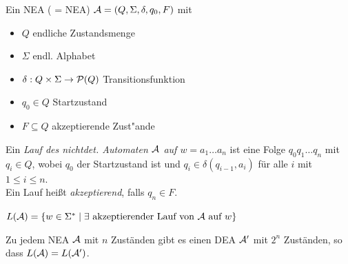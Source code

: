 \begin{Def}[name={[NEA]}]
	Ein \ac{NEA} ( = \acl{NEA}) $\mathcal{A} = (Q,\Sigma,\delta,q_0,F)$ mit
	\begin{itemize}
		\item $Q$ endliche Zustandsmenge
		\item $\Sigma$ endl. Alphabet
		\item $\delta:Q\x\Sigma\->\mathcal{P}(Q)$ Transitionsfunktion
		\item $q_0\in Q$ Startzustand
		\item $F\subseteq Q$ akzeptierende Zust"ande
	\end{itemize}
\end{Def}
\begin{Def}[name={[Lauf eines Automaten]}]
        Ein \emph{Lauf des nichtdet. Automaten $\mathcal{A}$ auf $w=a_1\dots a_n$} ist eine Folge $q_0q_1\dots q_n$ mit $q_i\in Q$, wobei $q_0$ der Startzustand ist und $q_i\in\delta(q_{i-1},a_i)$ für alle $i$ mit $1\leq i\leq n$.\\
        Ein Lauf heißt \emph{akzeptierend}, falls $q_n\in F$.
\end{Def}
\begin{Def}[name={[NEA zu DEA]}]
	$L(\mathcal{A})=\{ w\in\Sigma^* \mid \exists\text{ akzeptierender Lauf von $\mathcal{A}$ auf }w \}$
\end{Def}
\begin{Satz}[Rabin]
	Zu jedem \ac{NEA} $\mathcal{A}$ mit $n$ Zuständen gibt es einen \ac{DEA} $\mathcal{A}'$ mit $2^n$ Zuständen, so dass $L(\mathcal{A})=L(\mathcal{A}')$.
\end{Satz}
